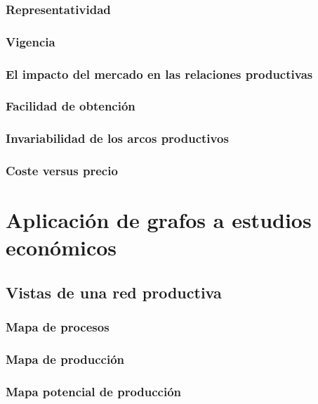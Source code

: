 \documentclass[11pt,spanish,letter]{article}
\begin{document}
   \subsubsection{Representatividad}

   \subsubsection{Vigencia}

   \subsubsection{El impacto del  mercado en las relaciones
   productivas}\label{mercado:sec} 

   \subsubsection{Facilidad de obtención}

   \subsubsection{Invariabilidad de los arcos productivos}

   \subsubsection{Coste versus precio}

 \section{Aplicación de grafos a estudios económicos}

  \subsection{Vistas de una red productiva}

   \subsubsection{Mapa de procesos}

   \subsubsection{Mapa de producción} \label{mapa-produccion:fig}

   \subsubsection{Mapa potencial de producción}
\end{document}
